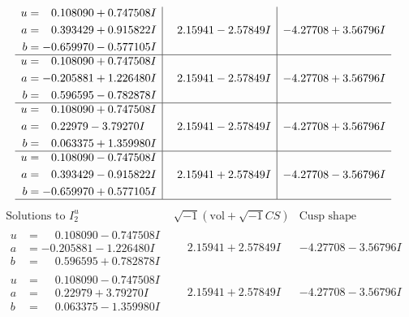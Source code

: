 \documentclass[1p]{elsarticle_modified}
\theoremstyle{definition}
\newcommand{\I}{\sqrt{-1}}
\begin{document}
$$\begin{array}{c|c|c}
\begin{aligned}
u &= \phantom{-}0.108090 + 0.747508 I \\
a &= \phantom{-}0.393429 + 0.915822 I \\
b &= -0.659970 - 0.577105 I\end{aligned}
 & \phantom{-}2.15941 - 2.57849 I & -4.27708 + 3.56796 I \\ \hline\begin{aligned}
u &= \phantom{-}0.108090 + 0.747508 I \\
a &= -0.205881 + 1.226480 I \\
b &= \phantom{-}0.596595 - 0.782878 I\end{aligned}
 & \phantom{-}2.15941 - 2.57849 I & -4.27708 + 3.56796 I \\ \hline\begin{aligned}
u &= \phantom{-}0.108090 + 0.747508 I \\
a &= \phantom{-}0.22979 - 3.79270 I \\
b &= \phantom{-}0.063375 + 1.359980 I\end{aligned}
 & \phantom{-}2.15941 - 2.57849 I & -4.27708 + 3.56796 I \\ \hline\begin{aligned}
u &= \phantom{-}0.108090 - 0.747508 I \\
a &= \phantom{-}0.393429 - 0.915822 I \\
b &= -0.659970 + 0.577105 I\end{aligned}
 & \phantom{-}2.15941 + 2.57849 I & -4.27708 - 3.56796 I\\
 \hline 
 \end{array}$$\newpage$$\begin{array}{c|c|c}  
\text{Solutions to }I^u_{2}& \I (\text{vol} + \sqrt{-1}CS) & \text{Cusp shape}\\
 \hline 
\begin{aligned}
u &= \phantom{-}0.108090 - 0.747508 I \\
a &= -0.205881 - 1.226480 I \\
b &= \phantom{-}0.596595 + 0.782878 I\end{aligned}
 & \phantom{-}2.15941 + 2.57849 I & -4.27708 - 3.56796 I \\ \hline\begin{aligned}
u &= \phantom{-}0.108090 - 0.747508 I \\
a &= \phantom{-}0.22979 + 3.79270 I \\
b &= \phantom{-}0.063375 - 1.359980 I\end{aligned}
 & \phantom{-}2.15941 + 2.57849 I & -4.27708 - 3.56796 I \\ \hline\begin{aligned}

\end{aligned}
\end{array}$$
\end{document}
